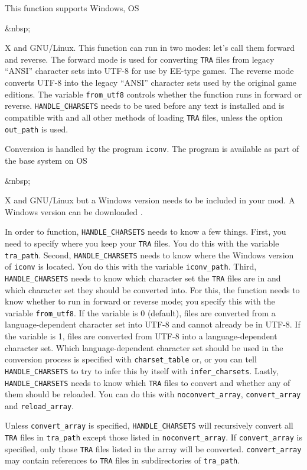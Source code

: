 \documentclass{article}
\def\ttref#1{\ahrefloc{#1}{\tt #1}}
\def\t#1{{\tt #1}}
\begin{document}
This function supports Windows, OS\begin{rawhtml}&nbsp;\end{rawhtml}X and GNU/Linux. This function can run in two modes: let's call them forward and reverse. The forward mode is used for converting \t{TRA} files from legacy ``ANSI'' character sets into UTF-8 for use by EE-type games. The reverse mode converts UTF-8 into the legacy ``ANSI'' character sets used by the original game editions. The variable \verb+from_utf8+ controls whether the function runs in forward or reverse. \verb+HANDLE_CHARSETS+ needs to be used before any text is installed and is compatible with \ttref{AUTO_TRA} and all other methods of loading \t{TRA} files, unless the option \verb+out_path+ is used.

Conversion is handled by the program \t{iconv}. The program is available as part of the base system on OS\begin{rawhtml}&nbsp;\end{rawhtml}X and GNU/Linux but a Windows version needs to be included in your mod. A Windows version can be downloaded .

In order to function, \verb+HANDLE_CHARSETS+ needs to know a few things. First, you need to specify where you keep your \t{TRA} files. You do this with the variable \verb+tra_path+. Second, \verb+HANDLE_CHARSETS+ needs to know where the Windows version of \t{iconv} is located. You do this with the variable \verb+iconv_path+. Third, \verb+HANDLE_CHARSETS+ needs to know which character set the \t{TRA} files are in and which character set they should be converted into. For this, the function needs to know whether to run in forward or reverse mode; you specify this with the variable \verb+from_utf8+. If the variable is 0 (default), files are converted from a language-dependent character set into UTF-8 and cannot already be in UTF-8. If the variable is 1, files are converted from UTF-8 into a language-dependent character set. Which language-dependent character set should be used in the conversion process is specified with \verb+charset_table+ or, or you can tell \verb+HANDLE_CHARSETS+ to try to infer this by itself with \verb+infer_charsets+. Lastly, \verb+HANDLE_CHARSETS+ needs to know which \t{TRA} files to convert and whether any of them should be reloaded. You can do this with \verb+noconvert_array+, \verb+convert_array+ and \verb+reload_array+.

Unless \verb+convert_array+ is specified, \verb+HANDLE_CHARSETS+ will recursively convert all \t{TRA} files in \verb+tra_path+ except those listed in \verb+noconvert_array+. If \verb+convert_array+ is specified, only those \t{TRA} files listed in the array will be converted. \verb+convert_array+ may contain references to \t{TRA} files in subdirectories of \verb+tra_path+.
\end{document}
